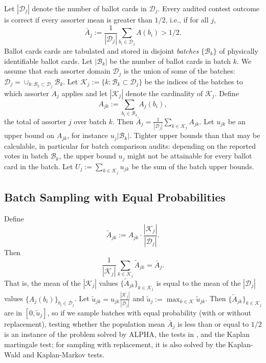 \documentclass[12pt,runningheads]{llncs}
\newcommand{\cB}{\ensuremath{\mathcal{B}}}
\newcommand{\cD}{\ensuremath{\mathcal{D}}}
\newcommand{\mc}[1]{\ensuremath{\mathcal{#1}}}
\begin{document}
{Let $|\cD_j|$ denote the number of ballot cards in $\cD_j$.
Every audited contest outcome is correct if every assorter mean is greater than $1/2$, i.e., if for all $j$,
\begin{equation}
    \bar{A}_j := \frac{1}{|\cD_j|} \sum_{b_i \in \cD_j } A(b_i) > 1/2.
\end{equation}
Ballot cards cards are tabulated and stored in disjoint \emph{batches}
$\{ \cB_k \}$ of physically identifiable ballot cards.
Let $|\cB_k|$ be the number of ballot cards in batch $k$.
We assume that each assorter domain $\cD_j$ is the union of some of the batches:
$\cD_j = \cup_{k: \cB_k \subset \cD_j} \cB_k$.
Let $\mc{K}_j  := \{k: \cB_k \subset \cD_j\}$ be the indices of the batches to which assorter $A_j$ applies
and let $|\mc{K}_j|$ denote the cardinality of $\mc{K}_j$.
Define
\begin{equation}
   A_{jk} := \sum_{b_i \in \cB_k} A_j(b_i),
\end{equation}
the total of assorter $j$ over batch $k$.
Then $ \bar{A}_j = \frac{1}{|\cD_j|} \sum_{k \in \mc{K}_j} A_{jk}$.
Let $u_{jk}$ be an upper bound on $A_{jk}$, for instance $u_j |\cB_k|$.
Tighter upper bounds than that may be calculable, in particular for batch comparison audits:
depending on the reported votes in batch $\cB_k$, the upper bound $u_j$ might not be attainable for every ballot card
in the batch.
Let $U_j := \sum_{k \in \mc{K}_j} u_{jk}$ be the sum of the batch upper bounds.

\subsection{Batch Sampling with Equal Probabilities}

Define
\begin{equation}
    \widetilde{A}_{jk} := A_{jk} \cdot \frac{|\mc{K}_j|}{|\cD_j|}.
\end{equation}
Then
\begin{equation}
    \frac{1}{|\mc{K}_j|} \sum_{k \in \mc{K}_j} \widetilde{A}_{jk} =  \bar{A}_j.
\end{equation}
That is, the mean of the $|\mc{K}_j|$ values $\{ \widetilde{A}_{jk}\}_{k \in \mc{K}_j}$ is equal to
the mean of the $|\cD_j|$ values $\{A_j(b_i)\}_{b_i \in \cD_j}$.
Let $\widetilde{u}_{jk} = u_{jk} \frac{|\mc{K}_j|}{|\cD_j|}$
and $\widetilde{u}_j := \max_{k \in \mc{K}} \widetilde{u}_{jk}$.
Then $\{ \widetilde{A}_{jk} \}_{k \in \mc{K}_j}$ are in $[0, \widetilde{u}_j]$, so
if we sample batches with equal probability (with or without replacement), testing whether the population mean $\bar{A}_{j}$
is less than or equal to $1/2$ is an instance of the problem solved by ALPHA,
the tests in \cite{waudby-smithRamdas21,waudby-smithEtal21}, and the Kaplan martingale test;
for sampling with replacement, it is also solved by the Kaplan-Wald and Kaplan-Markov tests.

}
\end{document}
